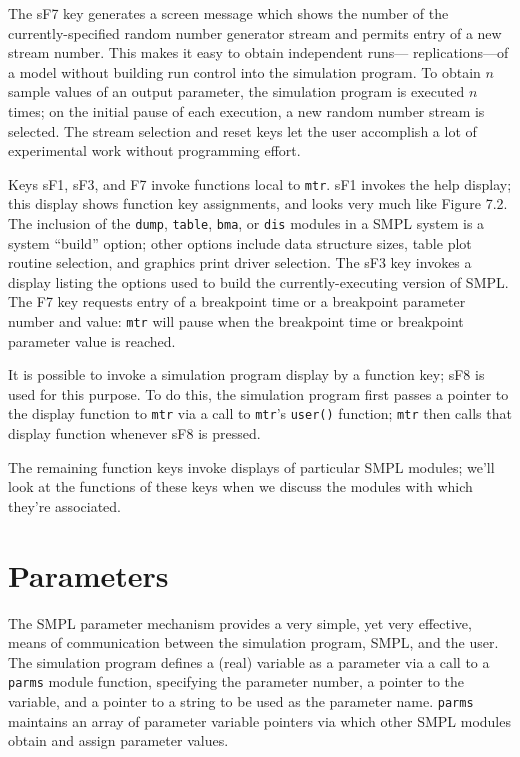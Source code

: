 The sF7 key generates a screen message which shows the number of the
currently-specified random number generator stream and permits entry of a
new stream number. This makes it easy to obtain independent runs---
replications---of a model without building run control into the simulation
program. To obtain $n$ sample values of an output parameter, the simulation
program is executed $n$ times; on the initial pause of each execution, a new
random number stream is selected. The stream selection and reset keys let
the user accomplish a lot of experimental work without programming effort.

Keys sF1, sF3, and F7 invoke functions local to \texttt{mtr}. sF1 invokes the help
display; this display shows function key assignments, and looks very much
like Figure 7.2. The inclusion of the \texttt{dump}, \texttt{table}, \texttt{bma}, or \texttt{dis} modules in a
SMPL system is a system ``build'' option; other options include data structure
sizes, table plot routine selection, and graphics print driver selection. The
sF3 key invokes a display listing the options used to build the currently-executing
version of SMPL. The F7 key requests entry of a breakpoint time or
a breakpoint parameter number and value: \texttt{mtr} will pause when the breakpoint
time or breakpoint parameter value is reached.

It is possible to invoke a simulation program display by a function key;
sF8 is used for this purpose. To do this, the simulation program first passes a
pointer to the display function to \texttt{mtr} via a call to \texttt{mtr}'s \texttt{user()} function; \texttt{mtr}
then calls that display function whenever sF8 is pressed.

The remaining function keys invoke displays of particular SMPL modules;
we'll look at the functions of these keys when we discuss the modules
with which they're associated.

\section{Parameters}
\label{sec:simenv-parameters}

The SMPL parameter mechanism provides a very simple, yet very
effective, means of communication between the simulation program, SMPL,
and the user. The simulation program defines a (real) variable as a
parameter via a call to a \texttt{parms} module function, specifying the parameter
number, a pointer to the variable, and a pointer to a string to be used as the
parameter name. \texttt{parms} maintains an array of parameter variable pointers
via which other SMPL modules obtain and assign parameter values.

